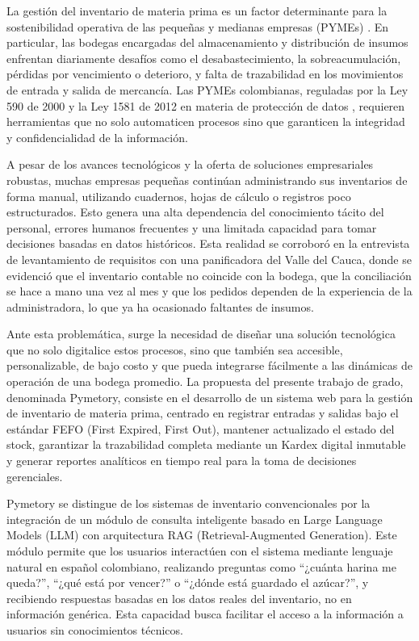 
La gestión del inventario de materia prima es un factor determinante para la sostenibilidad operativa de las pequeñas y medianas empresas (PYMEs) \cite{ley590,bbva2024mipymes}. En particular, las bodegas encargadas del almacenamiento y distribución de insumos enfrentan diariamente desafíos como el desabastecimiento, la sobreacumulación, pérdidas por vencimiento o deterioro, y falta de trazabilidad en los movimientos de entrada y salida de mercancía. Las PYMEs colombianas, reguladas por la Ley 590 de 2000 y la Ley 1581 de 2012 en materia de protección de datos \cite{ley1581}, requieren herramientas que no solo automaticen procesos sino que garanticen la integridad y confidencialidad de la información.

A pesar de los avances tecnológicos y la oferta de soluciones empresariales robustas, muchas empresas pequeñas continúan administrando sus inventarios de forma manual, utilizando cuadernos, hojas de cálculo o registros poco estructurados. Esto genera una alta dependencia del conocimiento tácito del personal, errores humanos frecuentes y una limitada capacidad para tomar decisiones basadas en datos históricos. Esta realidad se corroboró en la entrevista de levantamiento de requisitos con una panificadora del Valle del Cauca, donde se evidenció que el inventario contable no coincide con la bodega, que la conciliación se hace a mano una vez al mes y que los pedidos dependen de la experiencia de la administradora, lo que ya ha ocasionado faltantes de insumos.

Ante esta problemática, surge la necesidad de diseñar una solución tecnológica que no solo digitalice estos procesos, sino que también sea accesible, personalizable, de bajo costo y que pueda integrarse fácilmente a las dinámicas de operación de una bodega promedio. La propuesta del presente trabajo de grado, denominada Pymetory, consiste en el desarrollo de un sistema web para la gestión de inventario de materia prima, centrado en registrar entradas y salidas bajo el estándar FEFO (First Expired, First Out), mantener actualizado el estado del stock, garantizar la trazabilidad completa mediante un Kardex digital inmutable y generar reportes analíticos en tiempo real para la toma de decisiones gerenciales.

Pymetory se distingue de los sistemas de inventario convencionales por la integración de un módulo de consulta inteligente basado en Large Language Models (LLM) con arquitectura RAG (Retrieval-Augmented Generation). Este módulo permite que los usuarios interactúen con el sistema mediante lenguaje natural en español colombiano, realizando preguntas como ``¿cuánta harina me queda?'', ``¿qué está por vencer?'' o ``¿dónde está guardado el azúcar?'', y recibiendo respuestas basadas en los datos reales del inventario, no en información genérica. Esta capacidad busca facilitar el acceso a la información a usuarios sin conocimientos técnicos.

